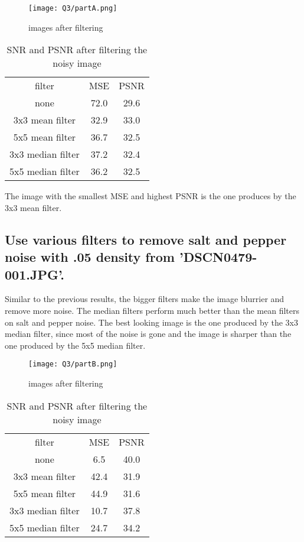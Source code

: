 \documentclass{article}
\begin{document}
	
	\begin{figure}[H]
		\texttt{[image: Q3/partA.png]}
		\caption{images after filtering}
	\end{figure}
	
	\begin{table}[H]
		\centering
		\begin{tabular}{ c | c | c }
			filter & MSE & PSNR \\
			none & 72.0 & 29.6 \\
			3x3 mean filter & 32.9 & 33.0 \\
			5x5 mean filter & 36.7 & 32.5 \\
			3x3 median filter & 37.2 & 32.4 \\
			5x5 median filter & 36.2 & 32.5 \\
		\end{tabular}
		\caption{SNR and PSNR after filtering the noisy image}
	\end{table}
	
	The image with the smallest MSE and highest PSNR is the one produces by the 3x3 mean filter.
		
	\subsection{Use various filters to remove salt and pepper noise with .05 density from 'DSCN0479-001.JPG'.}
	
	
	Similar to the previous results, the bigger filters make the image blurrier and remove more noise. The median filters perform much better than the mean filters on salt and pepper noise. The best looking image is the one produced by the 3x3 median filter, since most of the noise is gone and the image is sharper than the one produced by the 5x5 median filter. 
	
	
	\begin{figure}[H]
		\texttt{[image: Q3/partB.png]}
		\caption{images after filtering}
	\end{figure}
	
	\begin{table}[H]
		\centering
		\begin{tabular}{ c | c | c }
			filter & MSE & PSNR \\
			none & 6.5 & 40.0 \\
			3x3 mean filter & 42.4 & 31.9 \\
			5x5 mean filter & 44.9 & 31.6 \\
			3x3 median filter & 10.7 & 37.8 \\
			5x5 median filter & 24.7 & 34.2 \\
		\end{tabular}
		\caption{SNR and PSNR after filtering the noisy image}
	\end{table}
	
\end{document}
